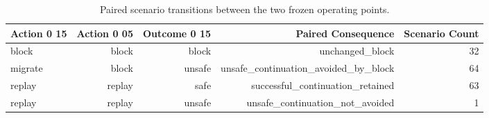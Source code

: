 \begin{table}[t]
\centering
\small
\begin{tabular}{lrrrr}
\toprule
Action 0 15 & Action 0 05 & Outcome 0 15 & Paired Consequence & Scenario Count \\
\midrule
block & block & block & unchanged\_block & 32 \\
migrate & block & unsafe & unsafe\_continuation\_avoided\_by\_block & 64 \\
replay & replay & safe & successful\_continuation\_retained & 63 \\
replay & replay & unsafe & unsafe\_continuation\_not\_avoided & 1 \\
\bottomrule
\end{tabular}
\caption{Paired scenario transitions between the two frozen operating points.}
\label{tab:rq4_fresh_paired_transitions}
\end{table}
